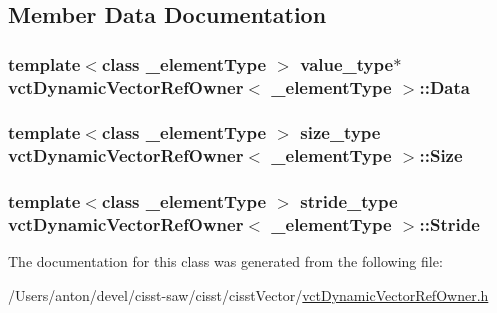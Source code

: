 \subsection{Member Data Documentation}
\hypertarget{classvct_dynamic_vector_ref_owner_a50664ce25ed6de8628998b3223998515}{}
\subsubsection[{Data}]{\setlength{\rightskip}{0pt plus 5cm}template$<$class \+\_\+element\+Type $>$ value\+\_\+type$\ast$ {\bf vct\+Dynamic\+Vector\+Ref\+Owner}$<$ \+\_\+element\+Type $>$\+::Data\hspace{0.3cm}{\ttfamily [protected]}}\label{classvct_dynamic_vector_ref_owner_a50664ce25ed6de8628998b3223998515}
\hypertarget{classvct_dynamic_vector_ref_owner_ab2a6a1ca285d5c64b4e39f6f33d1794d}{}
\subsubsection[{Size}]{\setlength{\rightskip}{0pt plus 5cm}template$<$class \+\_\+element\+Type $>$ size\+\_\+type {\bf vct\+Dynamic\+Vector\+Ref\+Owner}$<$ \+\_\+element\+Type $>$\+::Size\hspace{0.3cm}{\ttfamily [protected]}}\label{classvct_dynamic_vector_ref_owner_ab2a6a1ca285d5c64b4e39f6f33d1794d}
\hypertarget{classvct_dynamic_vector_ref_owner_ae346c9cef9e023214e0286791fedae25}{}
\subsubsection[{Stride}]{\setlength{\rightskip}{0pt plus 5cm}template$<$class \+\_\+element\+Type $>$ stride\+\_\+type {\bf vct\+Dynamic\+Vector\+Ref\+Owner}$<$ \+\_\+element\+Type $>$\+::Stride\hspace{0.3cm}{\ttfamily [protected]}}\label{classvct_dynamic_vector_ref_owner_ae346c9cef9e023214e0286791fedae25}


The documentation for this class was generated from the following file\+:\begin{DoxyCompactItemize}
\item 
/\+Users/anton/devel/cisst-\/saw/cisst/cisst\+Vector/\hyperlink{vct_dynamic_vector_ref_owner_8h}{vct\+Dynamic\+Vector\+Ref\+Owner.\+h}\end{DoxyCompactItemize}

